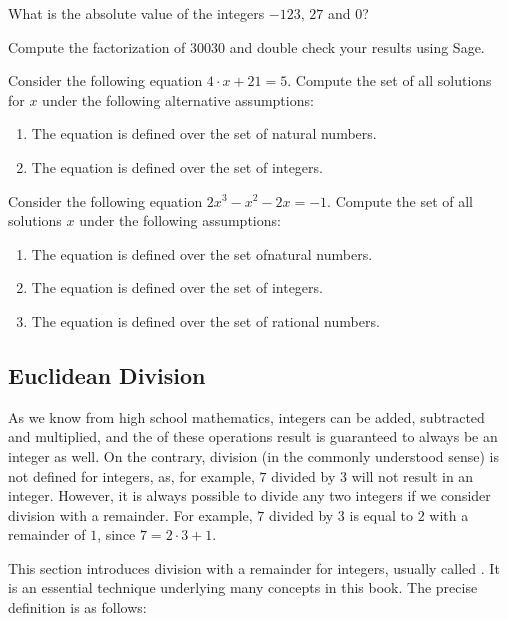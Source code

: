 \begin{exercise}
What is the absolute value of the integers $-123$, $27$ and $0$?
\end{exercise}
\begin{exercise}
Compute the factorization of $30030$ and double check your results using Sage.
\end{exercise}
\begin{exercise}
Consider the following equation $4\cdot x + 21 = 5$. Compute the set of all solutions for $x$ under the following alternative assumptions:
\begin{enumerate}
\item The equation is defined over the set of natural numbers.
\item The equation is defined over the set of integers.
\end{enumerate}
\end{exercise}
\begin{exercise}
Consider the following equation $2 x^3 - x^2 - 2 x = - 1$. Compute the set of all solutions $x$ under the following assumptions:
\begin{enumerate}
\item The equation is defined over the set ofnatural numbers.
\item The equation is defined over the set of integers.
\item The equation is defined over the set of rational numbers.
\end{enumerate}
\end{exercise}

\subsection{Euclidean Division}
\label{Euclidean_division}
As we know from high school mathematics, integers can be added, subtracted and multiplied, and the of these operations result is guaranteed to always be an integer as well.
On the contrary, division (in the commonly understood sense) is not defined for integers, as, for example, $7$ divided by $3$ will not result in an integer. However, it is always possible to divide any two integers if we consider division with a remainder. For example, $7$ divided by $3$ is equal to $2$ with a remainder of $1$, since $7 = 2\cdot 3 + 1$.

This section introduces division with a remainder for integers, usually called . It is an essential technique underlying many concepts in this book. The precise definition is as follows:

